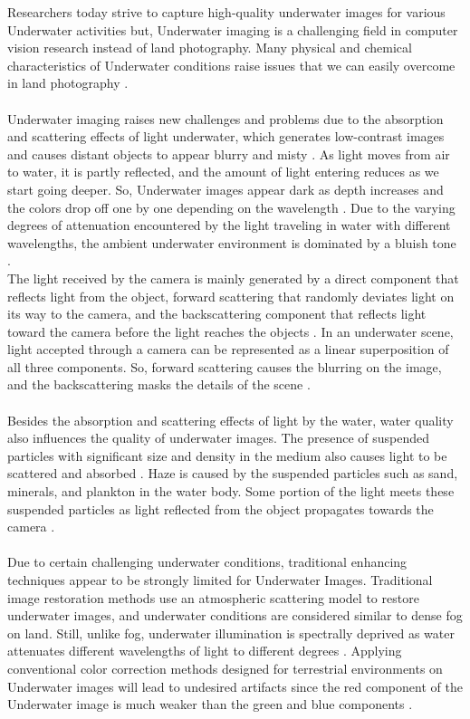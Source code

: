 \documentclass[a4paper,11pt,oneside]{article}
\begin{document}
  
  Researchers today strive to capture high-quality underwater images for various Underwater activities \cite{15} but, Underwater imaging is a challenging field in computer vision research instead of land photography. Many physical and chemical characteristics of Underwater conditions raise issues that we can easily overcome in land photography \cite{15}.\\
  \\
  Underwater imaging raises new challenges and problems due to the absorption and scattering effects of light underwater, which generates low-contrast images and causes distant objects to appear blurry and misty \cite{3}. As light moves from air to water, it is partly reflected, and the amount of light entering reduces as we start going deeper. So, Underwater images appear dark as depth increases and the colors drop off one by one depending on the wavelength \cite{4}. Due to the varying degrees of attenuation encountered by the light traveling in water with different wavelengths, the ambient underwater environment is dominated by a bluish tone \cite{20}.\\
  The light received by the camera is mainly generated by a direct component that reflects light from the object, forward scattering that randomly deviates light on its way to the camera, and the backscattering component that reflects light toward the camera before the light reaches the objects \cite{21}. In an underwater scene, light accepted through a camera can be represented as a linear superposition of all three components.  So, forward scattering causes the blurring on the image, and the backscattering masks the details of the scene \cite{21}.\\
  \\
  Besides the absorption and scattering effects of light by the water, water quality also influences the quality of underwater images. The presence of suspended particles with significant size and density in the medium also causes light to be scattered and absorbed \cite{8}. Haze is caused by the suspended particles such as sand, minerals, and plankton in the water body. Some portion of the light meets these suspended particles as light reflected from the object propagates towards the camera \cite{13}.\\
  \\
  Due to certain challenging underwater conditions, traditional enhancing techniques appear to be strongly limited for Underwater Images. Traditional image restoration methods use an atmospheric scattering model to restore underwater images\cite{11}, and underwater conditions are considered similar to dense fog on land. Still, unlike fog, underwater illumination is spectrally deprived as water attenuates different wavelengths of light to different degrees \cite{2}. Applying conventional color correction methods designed for terrestrial environments on Underwater images will lead to undesired artifacts since the red component of the Underwater image is much weaker than the green and blue components \cite{6}.\\
\end{document}
